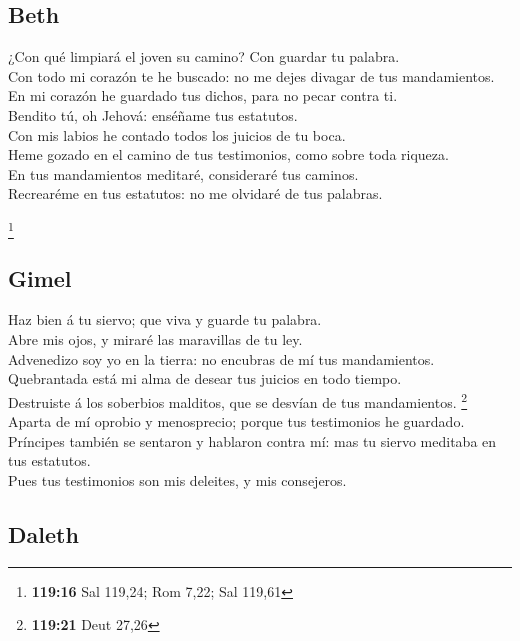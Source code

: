 \hypertarget{beth}{%
\subsection{Beth}\label{beth}}

 ¿Con qué limpiará el joven su camino? Con guardar tu
palabra.\\
 Con todo mi corazón te he buscado: no me dejes divagar de
tus mandamientos.\\
 En mi corazón he guardado tus dichos, para no pecar contra
ti.\\
 Bendito tú, oh Jehová: enséñame tus estatutos.\\
 Con mis labios he contado todos los juicios de tu boca.\\
 Heme gozado en el camino de tus testimonios, como sobre
toda riqueza.\\
 En tus mandamientos meditaré, consideraré tus caminos.\\
 Recrearéme en tus estatutos: no me olvidaré de tus
palabras.

\footnote{\textbf{119:16} Sal 119,24; Rom 7,22; Sal 119,61}

\hypertarget{gimel}{%
\subsection{Gimel}\label{gimel}}

 Haz bien á tu siervo; que viva y guarde tu palabra.\\
 Abre mis ojos, y miraré las maravillas de tu ley.\\
 Advenedizo soy yo en la tierra: no encubras de mí tus
mandamientos.\\
 Quebrantada está mi alma de desear tus juicios en todo
tiempo.\\
 Destruiste á los soberbios malditos, que se desvían de tus
mandamientos. \footnote{\textbf{119:21} Deut 27,26}\\
 Aparta de mí oprobio y menosprecio; porque tus testimonios
he guardado.\\
 Príncipes también se sentaron y hablaron contra mí: mas tu
siervo meditaba en tus estatutos.\\
 Pues tus testimonios son mis deleites, y mis consejeros.

\hypertarget{daleth}{%
\subsection{Daleth}\label{daleth}}

